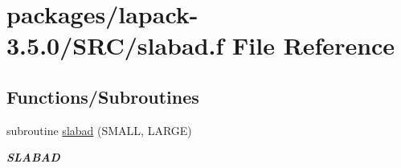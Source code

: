 \hypertarget{slabad_8f}{}\section{packages/lapack-\/3.5.0/\+S\+R\+C/slabad.f File Reference}
\label{slabad_8f}
\subsection*{Functions/\+Subroutines}
\begin{DoxyCompactItemize}
\item 
subroutine \hyperlink{group__auxOTHERauxiliary_ga117e4564430a16335ad47054c447cb79}{slabad} (S\+M\+A\+L\+L, L\+A\+R\+G\+E)
\begin{DoxyCompactList}\small\item\em {\bfseries S\+L\+A\+B\+A\+D} \end{DoxyCompactList}\end{DoxyCompactItemize}
